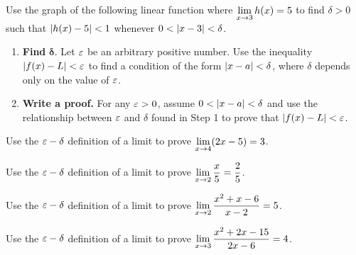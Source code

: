 \documentclass[mathNotesPreamble]{subfiles}
\begin{document}
\begin{ex*}
  Use the graph of the following linear function where $\displaystyle\lim_{x \to 3} h(x)=5$ to find $\delta>0$ such that ${\left\vert h(x)-5\right\vert}<1$ whenever $0<{\left\vert x-3\right\vert}<\delta$.
  \begin{flushright}
  \end{flushright}
\end{ex*}
\pagebreak

\begin{thmBox*}[Steps for proving that $\ds\lim_{x \to a} f(x)=L$]
  \begin{enumerate}
    \item \textbf{Find }$\bm \delta.$ Let $\varepsilon$ be an arbitrary positive number. Use the inequality ${\left\vert f(x)-L\right\vert}<\varepsilon$ to find a condition of the form ${\left\vert x-a\right\vert}<\delta$, where $\delta$ depends only on the value of $\varepsilon$.
    \item \textbf{Write a proof.} For any $\varepsilon>0$, assume $0<{\left\vert x-a\right\vert}<\delta$ and use the relationship between $\varepsilon$ and $\delta$ found in Step 1 to prove that ${\left\vert f(x)-L\right\vert}<\varepsilon$.
  \end{enumerate}
\end{thmBox*}
  
  \begin{ex*}
    Use the $\varepsilon-\delta$ definition of a limit to prove $\displaystyle\lim_{x \to 4}(2x-5)=3$.
  \end{ex*}
  \begin{ex*}
    Use the $\varepsilon-\delta$ definition of a limit to prove $\displaystyle\lim_{x \to 2}\dfrac{x}{5}=\dfrac{2}{5}$.
  \end{ex*}
  \pagebreak
  \begin{ex*}
    Use the $\varepsilon-\delta$ definition of a limit to prove $\displaystyle\lim_{x \to 2}\dfrac{x^2+x-6}{x-2}=5$.
  \end{ex*}
  \begin{ex*}
    Use the $\varepsilon-\delta$ definition of a limit to prove $\displaystyle\lim_{x \to 3}\dfrac{x^2+2x-15}{2x-6}=4$.
  \end{ex*}
  \pagebreak
\end{document}
